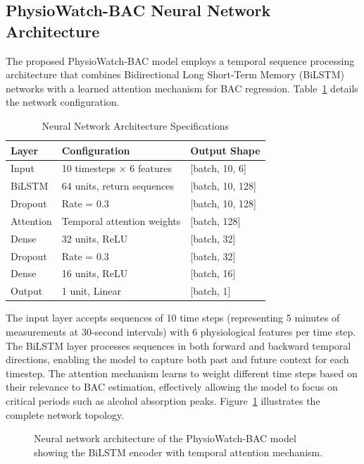 \documentclass[HARVARD,Times2COL]{WileyNJDv5}
\begin{document}
\subsection{PhysioWatch-BAC Neural Network Architecture}
The proposed PhysioWatch-BAC model employs a temporal sequence processing architecture that combines Bidirectional Long Short-Term Memory (BiLSTM) networks with a learned attention mechanism for BAC regression. Table~\ref{tab:model_arch} details the network configuration.
\begin{table}[htbp]
\caption{Neural Network Architecture Specifications}
\label{tab:model_arch}
\centering
\small
\begin{tabular}{@{}lll@{}}
\toprule
\textbf{Layer} & \textbf{Configuration} & \textbf{Output Shape} \\
\midrule
Input & 10 timesteps $\times$ 6 features & [batch, 10, 6] \\
BiLSTM & 64 units, return sequences & [batch, 10, 128] \\
Dropout & Rate = 0.3 & [batch, 10, 128] \\
Attention & Temporal attention weights & [batch, 128] \\
Dense & 32 units, ReLU & [batch, 32] \\
Dropout & Rate = 0.3 & [batch, 32] \\
Dense & 16 units, ReLU & [batch, 16] \\
Output & 1 unit, Linear & [batch, 1] \\
\bottomrule
\end{tabular}
\end{table}
The input layer accepts sequences of 10 time steps (representing 5 minutes of measurements at 30-second intervals) with 6 physiological features per time step. The BiLSTM layer processes sequences in both forward and backward temporal directions, enabling the model to capture both past and future context for each timestep. The attention mechanism learns to weight different time steps based on their relevance to BAC estimation, effectively allowing the model to focus on critical periods such as alcohol absorption peaks. Figure~\ref{fig:nn_arch} illustrates the complete network topology.

\begin{figure}[htbp]
\centering

\caption{Neural network architecture of the PhysioWatch-BAC model showing the BiLSTM encoder with temporal attention mechanism.}
\label{fig:nn_arch}
\end{figure}
\end{document}
